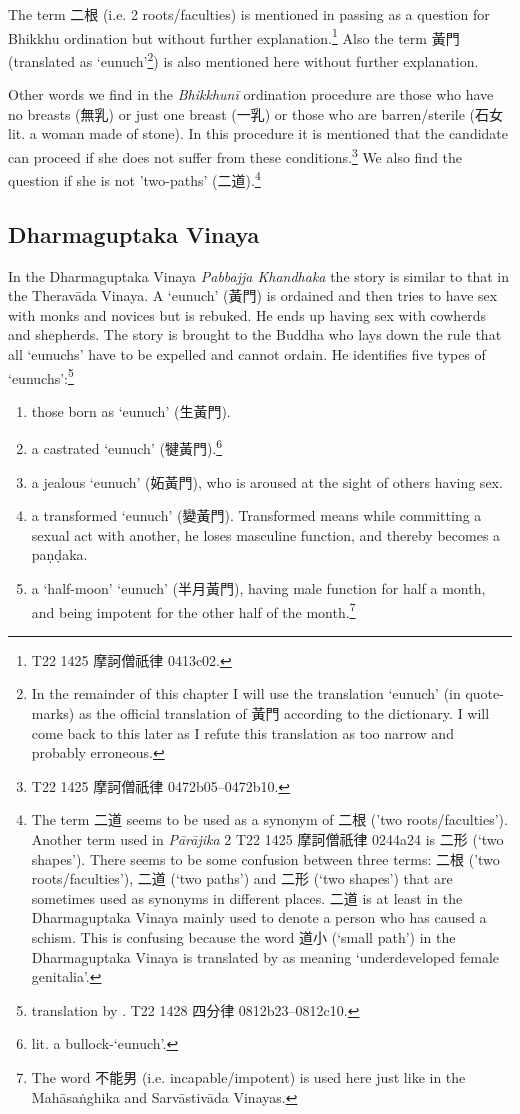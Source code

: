 The term 二根 (i.e. 2 roots/faculties) is mentioned in passing as a question for Bhikkhu ordination but without further explanation.\footnote{T22 1425 摩訶僧祇律 0413c02.} Also the term 黃門 (translated as `eunuch'\footnote{In the remainder of this chapter I will use the translation `eunuch' (in quote-marks) as the official translation of 黃門 according to the dictionary. I will come back to this later as I refute this translation as too narrow and probably erroneous.}) is also mentioned here without further explanation.

Other words we find in the {\em Bhikkhunī} ordination procedure are those who have no breasts (無乳) or just one breast (一乳) or those who are barren/sterile (石女 lit. a woman made of stone). In this procedure it is mentioned that the candidate can proceed if she does not suffer from these conditions.\footnote{T22 1425 摩訶僧祇律 0472b05–0472b10.} We also find the question if she is not ’two-paths’ (二道).\footnote{The term 二道 seems to be used as a synonym of 二根 ('two roots/faculties'). Another term used in {\em Pārājika} 2 T22 1425 摩訶僧祇律 0244a24 is 二形 (`two shapes'). There seems to be some confusion between three terms: 二根 ('two roots/faculties'), 二道 (`two paths') and 二形 (`two shapes') that are sometimes used as synonyms in different places. 二道 is at least in the Dharmaguptaka Vinaya mainly used to denote a person who has caused a schism. This is confusing because the word 道小 (`small path') in the Dharmaguptaka Vinaya is translated by \cite{bodhi} as meaning `underdeveloped female genitalia'.}

\subsection{Dharmaguptaka Vinaya}
In the Dharmaguptaka Vinaya {\em Pabbajja Khandhaka} the story is similar to that in the Theravāda Vinaya. A `eunuch' (黃門) is ordained and then tries to have sex with monks and novices but is rebuked. He ends up having sex with cowherds and shepherds. The story is brought to the Buddha who lays down the rule that all `eunuchs' have to be expelled and cannot ordain. He identifies five types of `eunuchs':\footnote{translation by \cite{bodhi}. T22 1428 四分律 0812b23–0812c10.} 

\begin{enumerate}
\item those born as `eunuch' (生黃門). 
\item a castrated `eunuch' (犍黃門).\footnote{lit. a bullock-`eunuch'.}
\item a jealous `eunuch' (妬黃門), who is aroused at the sight of others having sex.
\item a transformed `eunuch' (變黃門). Transformed means while committing a sexual act with another, he loses masculine function, and thereby becomes a paṇḍaka.
\item a `half-moon' `eunuch' (半月黃門), having male function for half a month, and being impotent for the other half of the month.\footnote{The word 不能男 (i.e. incapable/impotent) is used here just like in the Mahāsaṅghika and Sarvāstivāda Vinayas.}
\end{enumerate}

